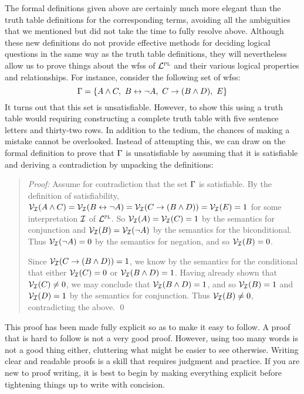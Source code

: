 The formal definitions given above are certainly much more elegant than the truth table definitions for the corresponding terms, avoiding all the ambiguities that we mentioned but did not take the time to fully resolve above.
Although these new definitions do not provide effective methods for deciding logical questions in the same way as the truth table definitions, they will nevertheless allow us to prove things about the wfss of $\mathcal{L}^{\textsc{pl}}$ and their various logical properties and relationships.
For instance, consider the following set of wfss:
$$ \Gamma = \lbrace A \wedge  C,\ B \leftrightarrow \neg A,\ C \rightarrow (B \wedge D),\ E\rbrace $$
It turns out that this set is unsatisfiable.
However, to show this using a truth table would requiring constructing a complete truth table with five sentence letters and thirty-two rows.
In addition to the tedium, the chances of making a mistake cannot be overlooked.
Instead of attempting this, we can draw on the formal definition to prove that $\Gamma$ is unsatisfiable by assuming that it is satisfiable and deriving a contradiction by unpacking the definitions: 

\begin{quote} 
  \textit{Proof:} Assume for contradiction that the set $\Gamma$ is satisfiable.
  By the definition of satisfiability, $\mathcal{V}_{\mathcal{I}}(A \wedge  C) = \mathcal{V}_{\mathcal{I}}(B \leftrightarrow \neg A) = \mathcal{V}_{\mathcal{I}}(C \rightarrow (B \wedge D)) = \mathcal{V}_{\mathcal{I}}(E) = 1$ for some interpretation $\mathcal{I}$ of $\mathcal{L}^{\textsc{pl}}$. 
  So $\mathcal{V}_{\mathcal{I}}(A) = \mathcal{V}_{\mathcal{I}}(C) = 1$ by the semantics for conjunction and $\mathcal{V}_{\mathcal{I}}(B) = \mathcal{V}_{\mathcal{I}}(\neg A)$ by the semantics for the biconditional. 
  Thus $\mathcal{V}_{\mathcal{I}}(\neg A) = 0$ by the semantics for negation, and so $\mathcal{V}_{\mathcal{I}}(B) = 0$. 

  Since $\mathcal{V}_{\mathcal{I}}(C \rightarrow (B \wedge D)) = 1$, we know by the semantics for the conditional that either $\mathcal{V}_{\mathcal{I}}(C) = 0$ or $\mathcal{V}_{\mathcal{I}}(B \wedge D) = 1$.
  Having already shown that $\mathcal{V}_{\mathcal{I}}(C) \neq 0$, we may conclude that $\mathcal{V}_{\mathcal{I}}(B \wedge D) = 1$, and so $\mathcal{V}_{\mathcal{I}}(B) = 1$ and $\mathcal{V}_{\mathcal{I}}(D) = 1$ by the semantics for conjunction.
  Thus $\mathcal{V}_{\mathcal{I}}(B) \neq 0$, contradicting the above.
  \qed
\end{quote}

This proof has been made fully explicit so as to make it easy to follow.
A proof that is hard to follow is not a very good proof.
However, using too many words is not a good thing either, cluttering what might be easier to see otherwise.
Writing clear and readable proofs is a skill that requires judgment and practice.
If you are new to proof writing, it is best to begin by making everything explicit before tightening things up to write with concision.

